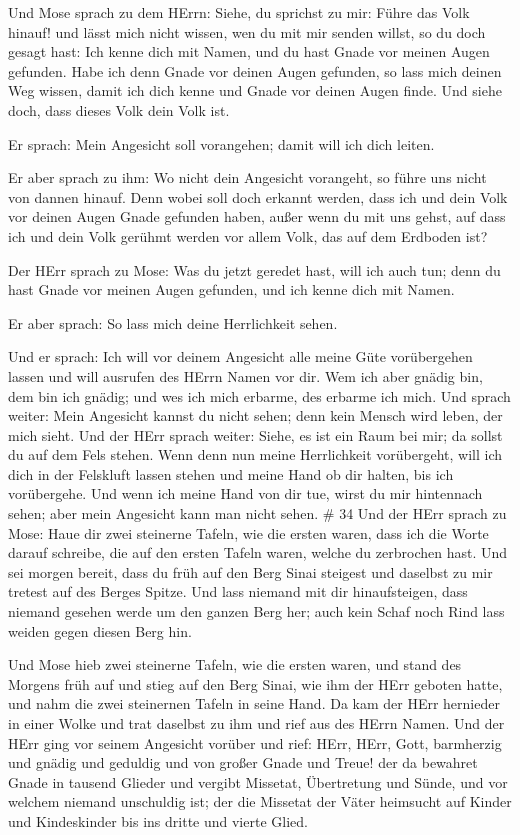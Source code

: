  Und Mose sprach zu dem HErrn: Siehe, du sprichst zu mir:
Führe das Volk hinauf! und lässt mich nicht wissen, wen du mit mir
senden willst, so du doch gesagt hast: Ich kenne dich mit Namen, und du
hast Gnade vor meinen Augen gefunden.  Habe ich denn Gnade
vor deinen Augen gefunden, so lass mich deinen Weg wissen, damit ich
dich kenne und Gnade vor deinen Augen finde. Und siehe doch, dass dieses
Volk dein Volk ist.

 Er sprach: Mein Angesicht soll vorangehen; damit will ich
dich leiten.

 Er aber sprach zu ihm: Wo nicht dein Angesicht vorangeht,
so führe uns nicht von dannen hinauf.  Denn wobei soll doch
erkannt werden, dass ich und dein Volk vor deinen Augen Gnade gefunden
haben, außer wenn du mit uns gehst, auf dass ich und dein Volk gerühmt
werden vor allem Volk, das auf dem Erdboden ist?

 Der HErr sprach zu Mose: Was du jetzt geredet hast, will
ich auch tun; denn du hast Gnade vor meinen Augen gefunden, und ich
kenne dich mit Namen.

 Er aber sprach: So lass mich deine Herrlichkeit sehen.

 Und er sprach: Ich will vor deinem Angesicht alle meine
Güte vorübergehen lassen und will ausrufen des HErrn Namen vor dir. Wem
ich aber gnädig bin, dem bin ich gnädig; und wes ich mich erbarme, des
erbarme ich mich.  Und sprach weiter: Mein Angesicht kannst
du nicht sehen; denn kein Mensch wird leben, der mich sieht.
 Und der HErr sprach weiter: Siehe, es ist ein Raum bei
mir; da sollst du auf dem Fels stehen.  Wenn denn nun meine
Herrlichkeit vorübergeht, will ich dich in der Felskluft lassen stehen
und meine Hand ob dir halten, bis ich vorübergehe.  Und
wenn ich meine Hand von dir tue, wirst du mir hintennach sehen; aber
mein Angesicht kann man nicht sehen. \# 34  Und der HErr
sprach zu Mose: Haue dir zwei steinerne Tafeln, wie die ersten waren,
dass ich die Worte darauf schreibe, die auf den ersten Tafeln waren,
welche du zerbrochen hast.  Und sei morgen bereit, dass du
früh auf den Berg Sinai steigest und daselbst zu mir tretest auf des
Berges Spitze.  Und lass niemand mit dir hinaufsteigen, dass
niemand gesehen werde um den ganzen Berg her; auch kein Schaf noch Rind
lass weiden gegen diesen Berg hin.

 Und Mose hieb zwei steinerne Tafeln, wie die ersten waren,
und stand des Morgens früh auf und stieg auf den Berg Sinai, wie ihm der
HErr geboten hatte, und nahm die zwei steinernen Tafeln in seine Hand.
 Da kam der HErr hernieder in einer Wolke und trat daselbst
zu ihm und rief aus des HErrn Namen.  Und der HErr ging vor
seinem Angesicht vorüber und rief: HErr, HErr, Gott, barmherzig und
gnädig und geduldig und von großer Gnade und Treue!  der da
bewahret Gnade in tausend Glieder und vergibt Missetat, Übertretung und
Sünde, und vor welchem niemand unschuldig ist; der die Missetat der
Väter heimsucht auf Kinder und Kindeskinder bis ins dritte und vierte
Glied.

